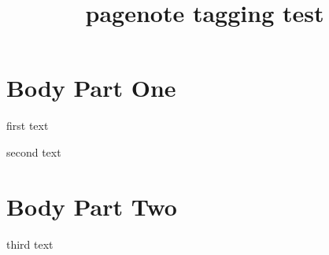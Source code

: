 \documentclass{article}
\title{pagenote tagging test}
\begin{document}
\section{Body Part One}

first text

second text

\section{Body Part Two}

third text

\printnotes
\end{document}
